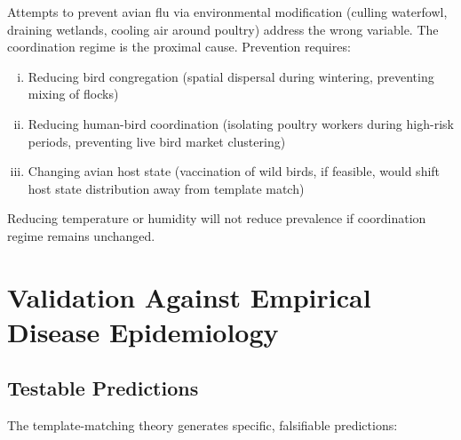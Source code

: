 \documentclass[11pt,twocolumn,a4paper]{article}
\begin{document}
\begin{corollary}
Attempts to prevent avian flu via environmental modification (culling waterfowl, draining wetlands, cooling air around poultry) address the wrong variable. The coordination regime is the proximal cause. Prevention requires:
\begin{enumerate}[(i)]
\item Reducing bird congregation (spatial dispersal during wintering, preventing mixing of flocks)
\item Reducing human-bird coordination (isolating poultry workers during high-risk periods, preventing live bird market clustering)
\item Changing avian host state (vaccination of wild birds, if feasible, would shift host state distribution away from template match)
\end{enumerate}
Reducing temperature or humidity will not reduce prevalence if coordination regime remains unchanged.
\end{corollary}

\section{Validation Against Empirical Disease Epidemiology}
\label{sec:validation}

\subsection{Testable Predictions}

The template-matching theory generates specific, falsifiable predictions:
\end{document}
